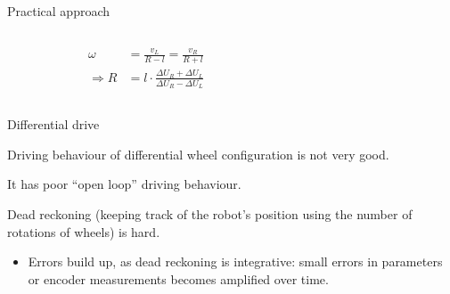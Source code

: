 \documentclass[compress]{beamer}
\begin{document}
\begin{frame}{Practical approach}
{\begin{columns}
\begin{column}{0.5\linewidth}
\begin{align*}
    \omega &= \frac{v_L}{R - l} = \frac{v_R}{R + l} \\
    \Rightarrow R &= l\cdot \frac{\Delta U_R + \Delta U_L}{\Delta U_R - \Delta U_L}
\end{align*}

            \end{column}
            \begin{column}{0.5\linewidth}
            \centering

            \end{column}
        \end{columns}

    }
\end{frame}

\begin{frame}{Differential drive}

Driving behaviour of differential wheel configuration is not very good.

It has poor ``open loop'' driving behaviour.

Dead reckoning (keeping track of the robot's position using the number
of rotations of wheels) is hard.

\begin{itemize}
    \item Errors build up, as dead reckoning is integrative: small errors in
  parameters or encoder measurements becomes amplified over time.
\end{itemize}

\end{frame}
\end{document}
